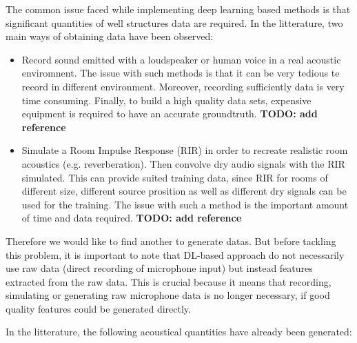 \documentclass{article}
\begin{document}
The common issue faced while implementing deep learning based methods is that significant quantities of well structures data are required. In the litterature, two main ways of obtaining data have been observed:

\begin{itemize}
    \item Record sound emitted with a loudspeaker or human voice in a real acoustic enviromnent. The issue with such methods is that it can be very tedious te record in different environment. Moreover, recording sufficiently data is very time consuming. Finally, to build a high quality data sets, expensive equipment is required to have an accurate groundtruth. \textbf{TODO: add reference}
    \item Simulate a Room Impulse Response (RIR) in order to recreate realistic room acoustics (e.g. reverberation). Then convolve dry audio signals with the RIR simulated. This can provide suited training data, since RIR for rooms of different size, different source prosition as well as different dry signals can be used for the training. The issue with such a method is the important amount of time and data required. \textbf{TODO: add reference}
\end{itemize}


Therefore we would like to find another to generate datas. But before tackling this problem, it is important to note that DL-based approach do not necessarily use raw data (direct recording of microphone input) but instead features extracted from the raw data. This is crucial because it means that recording, simulating or generating raw microphone data is no longer necessary, if good quality features could be generated directly. 



In the litterature, the following acoustical quantities have already been generated:





%

 
\end{document}
